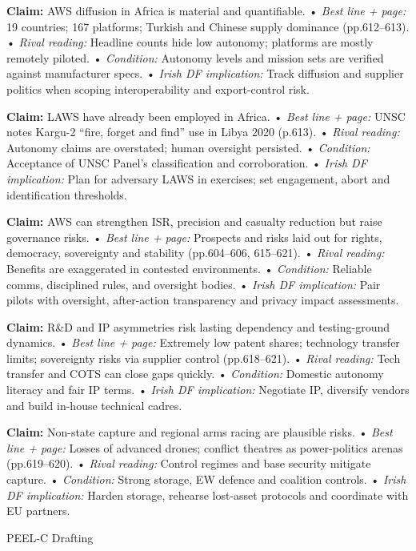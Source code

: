 \textbf{Claim:} AWS diffusion in Africa is material and quantifiable.
• \emph{Best line + page:} 19 countries; 167 platforms; Turkish and Chinese supply dominance (pp.612–613).
• \emph{Rival reading:} Headline counts hide low autonomy; platforms are mostly remotely piloted.
• \emph{Condition:} Autonomy levels and mission sets are verified against manufacturer specs.
• \emph{Irish DF implication:} Track diffusion and supplier politics when scoping interoperability and export-control risk.

\textbf{Claim:} LAWS have already been employed in Africa.
• \emph{Best line + page:} UNSC notes Kargu-2 “fire, forget and find” use in Libya 2020 (p.613).
• \emph{Rival reading:} Autonomy claims are overstated; human oversight persisted.
• \emph{Condition:} Acceptance of UNSC Panel’s classification and corroboration.
• \emph{Irish DF implication:} Plan for adversary LAWS in exercises; set engagement, abort and identification thresholds.

\textbf{Claim:} AWS can strengthen ISR, precision and casualty reduction but raise governance risks.
• \emph{Best line + page:} Prospects and risks laid out for rights, democracy, sovereignty and stability (pp.604–606, 615–621).
• \emph{Rival reading:} Benefits are exaggerated in contested environments.
• \emph{Condition:} Reliable comms, disciplined rules, and oversight bodies.
• \emph{Irish DF implication:} Pair pilots with oversight, after-action transparency and privacy impact assessments.

\textbf{Claim:} R&D and IP asymmetries risk lasting dependency and testing-ground dynamics.
• \emph{Best line + page:} Extremely low patent shares; technology transfer limits; sovereignty risks via supplier control (pp.618–621).
• \emph{Rival reading:} Tech transfer and COTS can close gaps quickly.
• \emph{Condition:} Domestic autonomy literacy and fair IP terms.
• \emph{Irish DF implication:} Negotiate IP, diversify vendors and build in-house technical cadres.

\textbf{Claim:} Non-state capture and regional arms racing are plausible risks.
• \emph{Best line + page:} Losses of advanced drones; conflict theatres as power-politics arenas (pp.619–620).
• \emph{Rival reading:} Control regimes and base security mitigate capture.
• \emph{Condition:} Strong storage, EW defence and coalition controls.
• \emph{Irish DF implication:} Harden storage, rehearse lost-asset protocols and coordinate with EU partners.

PEEL-C Drafting

